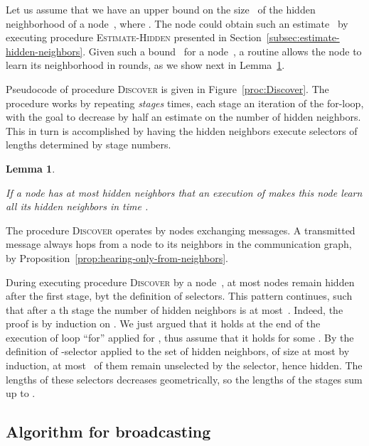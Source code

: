 \documentclass[11pt]{article}
\newcommand{\qed}{\hfill  \smallskip}
\newenvironment{proof}{\noindent{\bf Proof:}}{\qed}
\newtheorem{lemma}{Lemma}
\begin{document}
\label{subsec:discover-hidden-neighbors}



Let us assume that we have an upper bound  on the size~ of the hidden neighborhood of a node~, where .
The node  could obtain such an estimate~ by executing procedure \textsc{Estimate-Hidden} presented in Section~\ref{subsec:estimate-hidden-neighbors}.
Given such a bound~ for a node~, a routine  allows the node to learn its neighborhood  in  rounds, as we show next in Lemma~\ref{lem:Discover}. 

Pseudocode of procedure \textsc{Discover}  is given in Figure~\ref{proc:Discover}.
The procedure works by repeating \emph{stages}  times, each stage an iteration of the for-loop, with the goal to decrease  by half an estimate on the number of hidden neighbors.
This in turn is accomplished by having the hidden neighbors execute selectors of lengths determined by stage numbers.



\begin{lemma}
\label{lem:Discover}

If a node has at most  hidden neighbors that an execution of  makes this node learn all its hidden neighbors in time .
\end{lemma}

\begin{proof}
The procedure \textsc{Discover} operates by nodes exchanging messages.
A transmitted message always hops from a node to its neighbors in the communication graph, by Proposition~\ref{prop:hearing-only-from-neighbors}.

During executing procedure \textsc{Discover} by a node~, at most  nodes remain hidden after the first stage, byt the definition of selectors. 
This pattern continues, such that after a th stage the number of hidden neighbors is at most~.
Indeed, the proof is by induction on . We just argued that it holds at the end of the execution of loop ``for'' applied
for , thus assume that it holds for some . 
By the definition of -selector applied to the set of hidden neighbors, 
of size at most  by induction, at most~ of them remain unselected by the selector, hence hidden.
The lengths of these selectors decreases geometrically, so the lengths of the stages sum up to .
\end{proof}



\subsection{Algorithm for broadcasting}
\label{sec:algorithm-traverse-to-broadcast}
\end{document}
